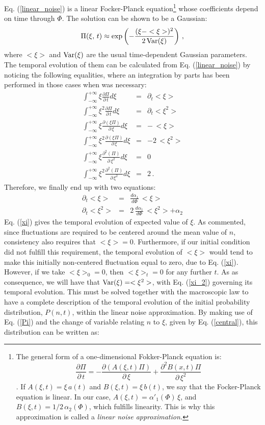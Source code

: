 Eq. (\ref{linear_noise}) is a linear Focker-Planck equation\footnote{The general form of a one-dimensional Fokker-Planck equation is: $$ \frac{\partial\Pi}{\partial\,t} = -\frac{\partial(A(\xi,t)\Pi)}{\partial\,\xi} + \frac{\partial^2 B(x,t)\Pi}{\partial\,\xi^2}$$. If $A(\xi,t)=\xi \, a(t)$ and $ B(\xi,t)=\xi \, b(t)$, we say that the Focker-Planck equation is linear. In our case, $A(\xi,t)=\alpha'_1(\Phi)\,\xi$, and $B(\xi,t) = 1/2\,\alpha_2(\Phi)$, which fulfills linearity. This is why this approximation is called a {\em linear noise approximation.}} whose coefficients depend on time through $\Phi$. The solution can be shown to be a Gaussian:
\begin{equation}
\label{Pi}
\Pi(\xi,\,t) \approx \exp\left(-\frac{(\xi-<\xi>)^2}{2\,\textup{Var}(\xi)}\right)\,,
\end{equation}
where $<\xi>$ and $\textup{Var}(\xi)$ are the usual time-dependent Gaussian parameters. The temporal evolution of them can be calculated from Eq. (\ref{linear_noise}) by noticing the following equalities, where an integration by parts has been performed in those cases when was necessary:
\begin{eqnarray}
\int_{-\infty}^{+\infty}\xi\frac{\partial\Pi}{\partial\,t}d\xi &=& \partial_t<\xi>\\
\int_{-\infty}^{+\infty}\xi^2\frac{\partial\Pi}{\partial\,t}d\xi &=& \partial_t<\xi^2>\\
\int_{-\infty}^{+\infty}\xi\frac{\partial(\xi\Pi)}{\partial\,\xi}d\xi &=& -\,<\xi>\\
\int_{-\infty}^{+\infty}\xi^2\frac{\partial(\xi\Pi)}{\partial\,\xi}d\xi &=& -2\,<\xi^2>\\
\int_{-\infty}^{+\infty}\xi\frac{\partial^2(\Pi)}{\partial\,\xi^2}d\xi &=& 0\\
\int_{-\infty}^{+\infty}\xi^2\frac{\partial^2(\Pi)}{\partial\,\xi^2}d\xi &=& 2\,.
\end{eqnarray}
Therefore, we finally end up with two equations:
\begin{eqnarray}
\label{xi}
\partial_t<\xi>   & = & \frac{d\alpha_1}{d\Phi}\,<\xi>\\
\partial_t<\xi^2> & = & 2\,\frac{d\alpha_1}{d\Phi}\,<\xi^2>+\alpha_2    
\label{xi_2}
\end{eqnarray}
Eq. (\ref{xi}) gives the temporal evolution of expected value of $\xi$. As commented, since fluctuations are required to be centered around the mean value of $n$, consistency also requires that $<\xi>=0$. Furthermore, if our initial condition did not fulfill this requirement, the temporal evolution of $<\xi>$ would tend to make this initially non-centered fluctuation equal to zero, due to Eq. (\ref{xi}). However, if we take $<\xi>_0=0$, then $<\xi>_t=0$ for any further $t$. As as consequence, we will have that $\textup{Var}(\xi)=<\xi^2>$, with Eq. (\ref{xi_2}) governing its temporal evolution. This must be solved together with the macroscopic law to have a complete description of the temporal evolution of the initial probability distribution, $P(n,t)$, within the linear noise approximation. By making use of Eq. (\ref{Pi}) and the change of variable relating $n$ to $\xi$, given by Eq. (\ref{central}), this distribution can be written as:
